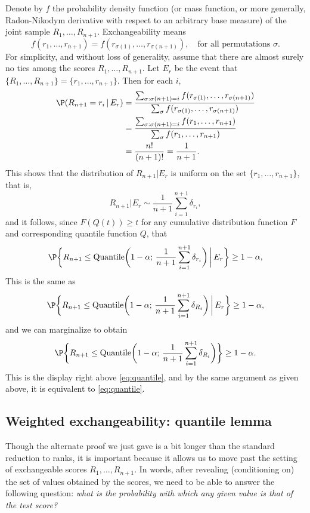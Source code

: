 \documentclass{article}
\begin{document}
Denote by $f$ the probability density function (or mass function, or more
generally, Radon-Nikodym derivative with respect to an arbitrary base measure)
of the joint sample $R_1,\dots,R_{n+1}$. Exchangeability means
\[
f(r_1,\dots,r_{n+1}) = f(r_{\sigma(1)}, \dots, r_{\sigma(n+1)}), \quad \text{for 
  all permutations $\sigma$}.
\] 
For simplicity, and without loss of generality, assume that there are almost
surely no ties among the scores $R_1,\dots,R_{n+1}$. Let $E_r$ be the event that 
$\{R_1,\dots,R_{n+1}\}=\{r_1,\dots,r_{n+1}\}$. Then for each $i$,  
\begin{align*}
\P(R_{n+1}=r_i \,|\, E_r)
&= \frac{\sum_{\sigma : \sigma(n+1)=i} f(r_{\sigma(1)}, \dots, r_{\sigma(n+1)})}  
{\sum_\sigma f(r_{\sigma(1)}, \dots, r_{\sigma(n+1)})} \\
&= \frac{\sum_{\sigma: \sigma(n+1)=i} f(r_1, \dots, r_{n+1})}  
{\sum_\sigma f(r_1, \dots, r_{n+1})} \\
&= \frac{n!}{(n+1)!} = \frac{1}{n+1}. 
\end{align*}
This shows that the distribution of $R_{n+1}|E_r$ is uniform on the set 
$\{r_1,\dots,r_{n+1}\}$, that is,
\[
R_{n+1}|E_r \sim \frac{1}{n+1}\sum_{i=1}^{n+1}\delta_{r_i},
\]
and it follows, since $F(Q(t)) \geq t$ for any cumulative distribution function
$F$ and corresponding quantile function $Q$, that   
\[
\P\bigg\{ R_{n+1} \leq \Quantile\bigg( 1-\alpha; \,
\frac{1}{n+1}\sum_{i=1}^{n+1}\delta_{r_i} \bigg) \, \bigg| \, 
E_r\bigg\} \geq 1-\alpha,
\]
This is the same as
\[
\P\bigg\{ R_{n+1} \leq \Quantile\bigg( 1-\alpha; \,
\frac{1}{n+1}\sum_{i=1}^{n+1}\delta_{R_i}\bigg) \, \bigg| \,  
E_r\bigg\} \geq 1-\alpha,
\]
and we can marginalize to obtain   
\[
\P\bigg\{ R_{n+1} \leq \Quantile\bigg( 1-\alpha; \,
\frac{1}{n+1}\sum_{i=1}^{n+1}\delta_{R_i}\bigg) \bigg\} \geq 1-\alpha.
\]
This is the display right above \eqref{eq:quantile}, and by the same argument as
given above, it is equivalent to \eqref{eq:quantile}.

\subsection{Weighted exchangeability: quantile lemma}

Though the alternate proof we just gave is a bit longer than the standard
reduction to ranks, it is important because it allows us to move past the
setting of exchangeable scores $R_1,\dots,R_{n+1}$. In words, after revealing
(conditioning on) the set of values obtained by the scores, we need to be able
to answer the following question: \emph{what is the probability with which any
  given value is that of the test score?}   
\end{document}
